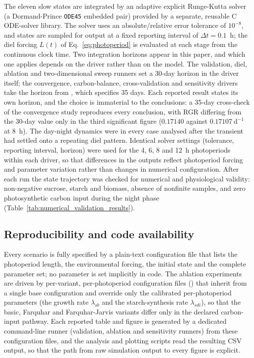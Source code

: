 \documentclass[a4paper,fleqn]{cas-sc}
\begin{document}
The eleven slow states are integrated by an adaptive explicit Runge-Kutta
solver (a Dormand-Prince \texttt{ODE45} embedded pair) provided by a separate,
reusable C ODE-solver library. The solver uses an absolute/relative error
tolerance of $10^{-8}$, and states are sampled for output at a fixed reporting
interval of $\Delta t = 0.1$~h; the diel forcing $L(t)$ of Eq.~\eqref{eq:photoperiod}
is evaluated at each stage from the continuous clock time. Two integration
horizons appear in this paper, and which one applies depends on the driver
rather than on the model. The validation, diel, ablation and two-dimensional
sweep runners set a 30-day horizon in the driver itself; the convergence,
carbon-balance, cross-validation and sensitivity drivers take the horizon from
, which specifies 35 days. Each reported result
states its own horizon, and the choice is immaterial to the conclusions: a
35-day cross-check of the convergence study reproduces every conclusion, with
RGR differing from the 30-day value only in the third significant figure
($0.17140$ against $0.17107\ \mathrm{d^{-1}}$ at 8~h). The day-night dynamics
were in every case analysed after the transient had settled onto a repeating
diel pattern. Identical
solver settings (tolerance, reporting interval, horizon) were used for the 4, 6,
8 and 12~h photoperiods within each driver, so that differences in the outputs
reflect photoperiod forcing and parameter variation rather than changes in
numerical configuration.
After each run the state trajectory was checked for numerical and physiological
validity: non-negative sucrose, starch and biomass, absence of nonfinite
samples, and zero photosynthetic carbon input during the night phase
(Table~\ref{tab:numerical_validation_results}).

\subsection{Reproducibility and code availability}

Every scenario is fully specified by a plain-text configuration file that lists
the photoperiod length, the environmental forcing, the initial state and the
complete parameter set; no parameter is set implicitly in code. The ablation
experiments are driven by per-variant, per-photoperiod configuration files
() that inherit from a single base
configuration and override only the calibrated per-photoperiod parameters
(the growth rate $\lambda_{sb}$ and the starch-synthesis rate $\lambda_{sdi}$),
so that the basic, Farquhar and Farquhar-Jarvis variants differ only in the
declared carbon-input pathway. Each reported table and figure is generated by a
dedicated command-line runner (validation, ablation and sensitivity runners)
from these configuration files, and the analysis and plotting scripts read the
resulting CSV output, so that the path from raw simulation output to every
figure is explicit.
\end{document}
